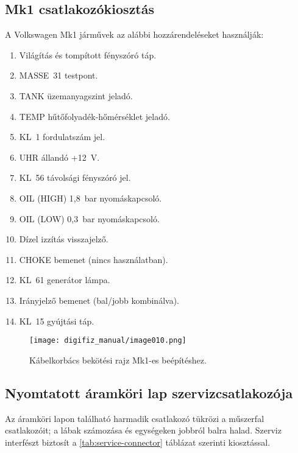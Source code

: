\subsection{Mk1 csatlakozókiosztás}
A Volkswagen Mk1 járművek az alábbi hozzárendeléseket használják:
\begin{enumerate}
    \item Világítás és tompított fényszóró táp.
    \item MASSE~31 testpont.
    \item TANK üzemanyagszint jeladó.
    \item TEMP hűtőfolyadék-hőmérséklet jeladó.
    \item KL~1 fordulatszám jel.
    \item UHR állandó +12~V.
    \item KL~56 távolsági fényszóró jel.
    \item OIL (HIGH) 1{,}8~bar nyomáskapcsoló.
    \item OIL (LOW) 0{,}3~bar nyomáskapcsoló.
    \item Dízel izzítás visszajelző.
    \item CHOKE bemenet (nincs használatban).
    \item KL~61 generátor lámpa.
    \item Irányjelző bemenet (bal/jobb kombinálva).
    \item KL~15 gyújtási táp.
\end{enumerate}
\begin{figure}[htbp]
    \centering
    \texttt{[image: digifiz\_manual/image010.png]}
    \caption{Kábelkorbács bekötési rajz Mk1-es beépítéshez.}
\end{figure}

\subsection{Nyomtatott áramköri lap szervizcsatlakozója}
Az áramköri lapon található harmadik csatlakozó tükrözi a műszerfal csatlakozóit; a lábak számozása \ReplicaGenOneShort{} és \ReplicaNextShort{} egységeken jobbról balra halad. Szerviz interfészt biztosít a \autoref{tab:service-connector} táblázat szerinti kiosztással.

